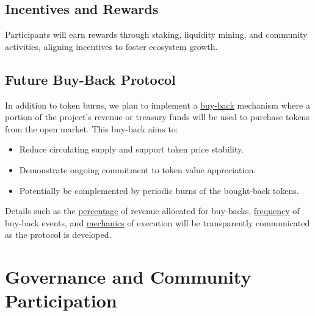 \documentclass{article}
\begin{document}
\begin{tcolorbox}[colback=headerColor!10!white, colframe=headerColor, boxrule=2pt, width=\textwidth, arc=6mm, left=8mm, right=8mm, top=6mm, bottom=6mm]
\subsection[
  \texorpdfstring{\color{primaryColor}Incentives and Rewards}{Incentives and Rewards}
]{\color{primaryColor}Incentives and Rewards}
Participants will earn rewards through staking, liquidity mining, and community activities, aligning incentives to foster ecosystem growth.
\subsection[
  \texorpdfstring{\color{primaryColor}Future Buy-Back Protocol}{Future Buy-Back Protocol}
]{\color{primaryColor}Future Buy-Back Protocol}
In addition to token burns, we plan to implement a \underline{buy-back} mechanism where a portion of the project's revenue or treasury funds will be used to purchase tokens from the open market. This buy-back aims to:

\begin{itemize}
  \item Reduce circulating supply and support token price stability.
  \item Demonstrate ongoing commitment to token value appreciation.
  \item Potentially be complemented by periodic burns of the bought-back tokens.
\end{itemize}

Details such as the \underline{percentage} of revenue allocated for buy-backs, \underline{frequency} of buy-back events, and \underline{mechanics} of execution will be transparently communicated as the protocol is developed.

\end{tcolorbox}

\vspace{1em}


\section[
  \texorpdfstring{\color{primaryColor}Governance and Community Participation}{Governance and Community Participation}
]{\color{primaryColor}\textbf{Governance and Community Participation}}
\end{document}
